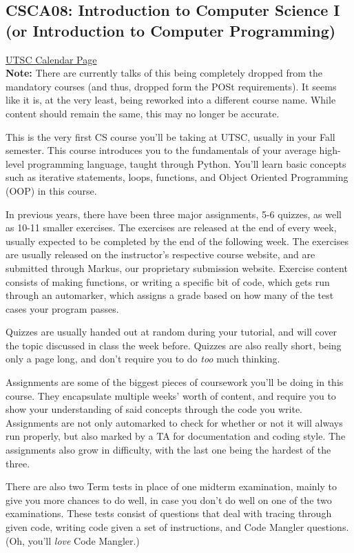 \documentclass[11pt]{article}
\begin{document}
\subsection{CSCA08: Introduction to Computer Science I (or Introduction to Computer Programming)}

\href{https://utsc.calendar.utoronto.ca/course/CSCA08H3}{UTSC Calendar Page}\\

\textbf{Note:} There are currently talks of this being completely dropped from the mandatory courses (and thus, dropped form the POSt requirements). It seems like it is, at the very least, being reworked into a different course name. While content should remain the same, this may no longer be accurate.\par
This is the very first CS course you'll be taking at UTSC, usually in your Fall semester.  This course introduces you to the fundamentals of your average high-level programming language, taught through Python.  You'll learn basic concepts such as iterative statements, loops, functions, and Object Oriented Programming (OOP) in this course.\par  
In previous years, there have been three major assignments, 5-6 quizzes, as well as 10-11 smaller exercises.  The exercises are released at the end of every week, usually expected to be completed by the end of the following week.  The exercises are usually released on the instructor's respective course website, and are submitted through Markus, our proprietary submission website.  Exercise content consists of making functions, or writing a specific bit of code, which gets run through an automarker, which assigns a grade based on how many of the test cases your program passes.\par
Quizzes are usually handed out at random during your tutorial, and will cover the topic discussed in class the week before.  Quizzes are also really short, being only a page long, and don't require you to do \textit{too} much thinking.\par
Assignments are some of the biggest pieces of coursework you'll be doing in this course.  They encapsulate multiple weeks' worth of content, and require you to show your understanding of said concepts through the code you write.  Assignments are not only automarked to check for whether or not it will always run properly, but also marked by a TA for documentation and coding style.  The assignments also grow in difficulty, with the last one being the hardest of the three. \par
There are also two Term tests in place of one midterm examination, mainly to give you more chances to do well, in case you don't do well on one of the two examinations.  These tests consist of questions that deal with tracing through given code, writing code given a set of instructions, and Code Mangler questions. (Oh, you'll \textit{love} Code Mangler.)\par
\end{document}
